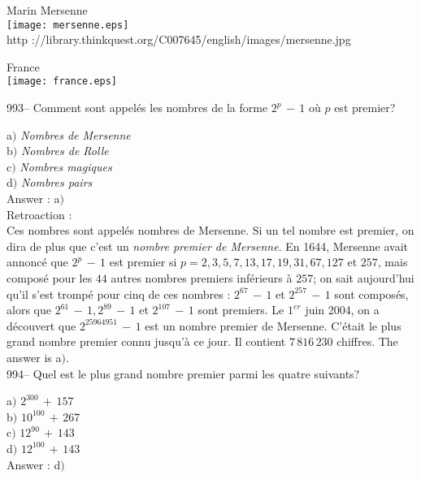 ﻿\documentclass[letterpaper, 12pt]{article}
\begin{document}
        \begin{center}
        Marin Mersenne\\
    \texttt{[image: mersenne.eps]}\\
        {\footnotesize http
://library.thinkquest.org/C007645/english/images/mersenne.jpg}
    \end{center}

        \begin{center}
        France\\
    \texttt{[image: france.eps]}\\
    \end{center}

993-- Comment sont appel\'es les nombres de la forme $2^p\,-\,1$
o\`u $p$ est premier?

a$)$ {\sl Nombres de Mersenne} \\
b$)$ {\sl Nombres de Rolle} \\
c$)$ {\sl Nombres magiques} \\
d$)$ {\sl Nombres pairs}\\

Answer : a$)$\\

Retroaction : \\
Ces nombres sont appel\'es nombres de Mersenne. Si un tel nombre est
premier, on dira de plus que c'est un {\sl nombre premier de
Mersenne}. En 1644, Mersenne avait annonc\'e que $2^p\,-\,1$ est
premier si $p=2,3,5,7,13,17,19,31,67,127$ et $257$, mais compos\'e
pour les $44$ autres nombres premiers inf\'erieurs \`a $257$; on
sait aujourd'hui qu'il s'est tromp\'e pour cinq de ces nombres :
$2^{67}\,-\,1$ et $2^{257}\,-\,1$ sont compos\'es, alors que
$2^{61}\,-\,1,2^{89}\,-\,1$ et $2^{107}\,-\,1$ sont premiers. Le
$1^{er}$ juin 2004, on a d\'ecouvert que $2^{25 964 951}\,-\,1$ est
un nombre premier de Mersenne. C'\'etait le plus grand nombre
premier connu jusqu'\`a ce jour. Il contient $7\,816\,230$ chiffres.
The answer is a$)$.\\

994-- Quel est le plus grand nombre premier parmi les quatre
suivants?

a$)$ $2^{300}\,+\,157$ \\
b$)$ $10^{100}\,+\,267$ \\
c$)$ $12^{90}\,+\,143$ \\
d$)$ $12^{100}\,+\,143$\\

Answer : d$)$\\
\end{document}
